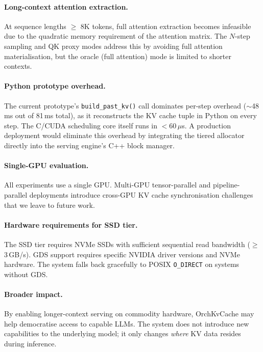 \documentclass[acmsmall,nonacm,screen]{acmart}
\newcommand{\sys}{OrchKvCache}
\begin{document}
\paragraph{Long-context attention extraction.}
At sequence lengths $\geq$ 8K tokens, full attention extraction becomes
infeasible due to the quadratic memory requirement of the attention matrix.
The $N$-step sampling and QK proxy modes address this by avoiding full
attention materialisation, but the oracle (full attention) mode is limited
to shorter contexts.

\paragraph{Python prototype overhead.}
The current prototype's \texttt{build\_past\_kv()} call dominates per-step
overhead (${\sim}$48\,ms out of 81\,ms total), as it reconstructs the
KV cache tuple in Python on every step.  The C/CUDA scheduling core itself
runs in $<$60\,$\mu$s.  A production deployment would eliminate this
overhead by integrating the tiered allocator directly into the serving
engine's C++ block manager.

\paragraph{Single-GPU evaluation.}
All experiments use a single GPU.  Multi-GPU tensor-parallel and
pipeline-parallel deployments introduce cross-GPU KV cache synchronisation
challenges that we leave to future work.

\paragraph{Hardware requirements for SSD tier.}
The SSD tier requires NVMe SSDs with sufficient sequential read bandwidth
($\geq$3\,GB/s).  GDS support requires specific NVIDIA driver versions
and NVMe hardware.  The system falls back gracefully to POSIX
\texttt{O\_DIRECT} on systems without GDS.

\paragraph{Broader impact.}
By enabling longer-context serving on commodity hardware, \sys{} may
help democratise access to capable LLMs.  The system does not introduce
new capabilities to the underlying model; it only changes \emph{where}
KV data resides during inference.


\end{document}

